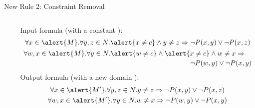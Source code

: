 \documentclass{beamer}
\begin{document}
\begin{frame}{New Rule 2: Constraint Removal}
  \begin{columns}
    \begin{column}{0.20\textwidth}
      \centering
    \end{column}
    \begin{column}{0.8\textwidth}
      \begin{example}
        Input formula (with a constant ):
        \begin{gather*}
        \forall x \in \alert{M}. \forall y, z \in N. \alert{x \ne c} \land y \ne z \Rightarrow \neg P(x, y) \lor \neg P(x, z) \\
        \begin{multlined}
          \forall w,x \in \alert{M}. \forall y \in N. \alert{w \ne c} \land \alert{x \ne c} \land w \ne x \Rightarrow \\
          \neg P(w, y) \lor \neg P(x, y)
        \end{multlined}
        \end{gather*}
        Output formula (with a new domain ):
        \begin{gather*}
          \forall x \in \alert{M'}. \forall y, z \in N. y \ne z \Rightarrow \neg P(x, y) \lor \neg P(x, z) \\
          \forall w,x \in \alert{M'}. \forall y \in N. w \ne x \Rightarrow \neg P(w, y) \lor \neg P(x, y)
        \end{gather*}
      \end{example}
    \end{column}
  \end{columns}
\end{frame}
\end{document}
